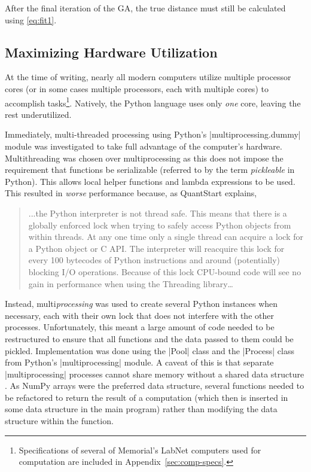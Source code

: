 After the final iteration of the GA, the true distance must still be calculated
using \eqref{eq:fit1}.

\subsection{Maximizing Hardware Utilization}\label{ssec:hardware}
At the time of writing, nearly all modern computers utilize multiple processor
cores (or in some cases multiple processors, each with multiple cores) to 
accomplish tasks\footnote{Specifications of several of Memorial's LabNet 
computers used for computation are included in Appendix~\ref{sec:comp-specs}.}.
Natively, the Python language uses only {\em one} core, leaving the rest 
underutilized. 

Immediately, multi-threaded processing using Python's 
|multiprocessing.dummy| module was investigated to take full 
advantage of the computer's hardware. Multithreading was chosen over
multiprocessing as this does not impose the requirement that functions 
be serializable (referred to by the term {\em pickleable} in Python). This 
allows local helper functions and lambda expressions to be used.
This resulted in {\em worse} performance because, as QuantStart explains,
\begin{quote}
	...the Python interpreter is not thread safe. This means that there is a
	globally enforced lock when trying to safely access Python objects from 
	within threads. At any one time only a single thread can acquire a lock 
	for a Python object or C API. The interpreter will reacquire this lock for 
	every 100 bytecodes of Python instructions and around (potentially) 
	blocking I/O operations. Because of this lock CPU-bound code will see 
	no gain in performance when using the Threading library\ldots
	\cite{quantstart}
\end{quote}
Instead, multi{\em processing} was used to create several Python instances
when necessary, each with their own lock that does not interfere with the
other processes. Unfortunately, this meant a large amount of code needed
to be restructured to ensure that all functions and the data passed to them
could be pickled. Implementation was done using the |Pool| class and the
|Process| class from Python's |multiprocessing| module. A caveat of this 
is that separate |multiprocessing| processes cannot share memory without
a shared data structure \cite{wang}. As NumPy arrays were the preferred data
structure, several functions needed to be refactored to return the result
of a computation (which then is inserted in some data structure in the main 
program) rather than modifying the data structure within the function.

